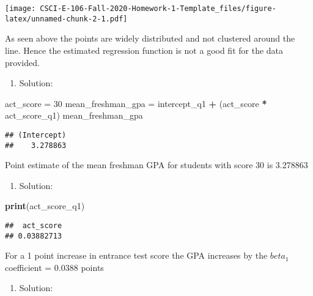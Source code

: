 \documentclass[
]{article}
\newenvironment{Shaded}{\begin{snugshade}}{\end{snugshade}}
\newcommand{\DecValTok}[1]{\textcolor[rgb]{0.00,0.00,0.81}{#1}}
\newcommand{\KeywordTok}[1]{\textcolor[rgb]{0.13,0.29,0.53}{\textbf{#1}}}
\newcommand{\NormalTok}[1]{#1}
\newcommand{\OperatorTok}[1]{\textcolor[rgb]{0.81,0.36,0.00}{\textbf{#1}}}
\newcommand{\StringTok}[1]{\textcolor[rgb]{0.31,0.60,0.02}{#1}}
\providecommand{\tightlist}{%
  \setlength{\itemsep}{0pt}\setlength{\parskip}{0pt}}
\begin{document}
\texttt{[image: CSCI-E-106-Fall-2020-Homework-1-Template\_files/figure-latex/unnamed-chunk-2-1.pdf]}

As seen above the points are widely distributed and not clustered around
the line. Hence the estimated regression function is not a good fit for
the data provided.

\begin{enumerate}
\def\labelenumi{\alph{enumi})}
\setcounter{enumi}{2}
\tightlist
\item
  Solution:
\end{enumerate}

\begin{Shaded}
\begin{Highlighting}[]
\NormalTok{act_score =}\StringTok{ }\DecValTok{30}
\NormalTok{mean_freshman_gpa =}\StringTok{ }\NormalTok{intercept_q1 }\OperatorTok{+}\StringTok{ }\NormalTok{(act_score }\OperatorTok{*}\StringTok{ }\NormalTok{act_score_q1)}
\NormalTok{mean_freshman_gpa}
\end{Highlighting}
\end{Shaded}

\begin{verbatim}
## (Intercept) 
##    3.278863
\end{verbatim}

Point estimate of the mean freshman GPA for students with score 30 is
3.278863

\begin{enumerate}
\def\labelenumi{\alph{enumi})}
\setcounter{enumi}{3}
\tightlist
\item
  Solution:
\end{enumerate}

\begin{Shaded}
\begin{Highlighting}[]
\KeywordTok{print}\NormalTok{(act_score_q1)}
\end{Highlighting}
\end{Shaded}

\begin{verbatim}
##  act_score 
## 0.03882713
\end{verbatim}

For a 1 point increase in entrance test score the GPA increases by the
\(beta_1\) coefficient = 0.0388 points

\begin{enumerate}
\def\labelenumi{\alph{enumi})}
\setcounter{enumi}{4}
\tightlist
\item
  Solution:
\end{enumerate}
\end{document}
